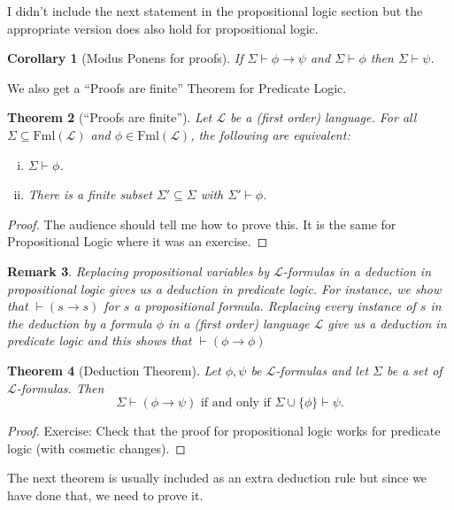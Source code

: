 \documentclass[11pt]{article}
\newcommand{\proves}{\vdash}
\newcommand{\Fml}{\textrm{Fml}}
\newtheorem{theorem}{Theorem}[section]
\newtheorem{remark}[theorem]{Remark}
\newtheorem{cor}[theorem]{Corollary}
\newcommand{\mcal}[1]{\mathcal{#1}}
\begin{document}
I didn't include the next statement in the propositional logic section but the appropriate version does also hold for propositional logic.

\begin{cor}[Modus Ponens for proofs]
If $\Sigma\proves \phi\rightarrow \psi$ and $\Sigma\proves \phi$ then $\Sigma\proves \psi$.
\end{cor}


We also get a ``Proofs are finite'' Theorem for Predicate Logic.

\begin{theorem}[``Proofs are finite'']
Let $\mcal{L}$ be a (first order) language. For all $\Sigma\subseteq \Fml(\mcal{L})$ and $\phi\in \Fml(\mcal{L})$, the following are equivalent:
\begin{enumerate}[(i)]
\item $\Sigma\proves \phi$.
\item There is a finite subset $\Sigma'\subseteq \Sigma$ with $\Sigma'\proves \phi$.
\end{enumerate}
\end{theorem}
\begin{proof}
The audience should tell me how to prove this. It is the same for Propositional Logic where it was an exercise.
\end{proof}

\begin{remark}
Replacing propositional variables by $\mcal{L}$-formulas in a deduction in propositional logic gives us a deduction in predicate logic. For instance, we show that $\vdash (s\rightarrow s)$ for $s$ a propositional formula. Replacing every instance of $s$ in the deduction by a formula $\phi$ in a (first order) language $\mcal{L}$ give us a deduction in predicate logic and this shows that $\vdash (\phi\rightarrow \phi)$
\end{remark}

\begin{theorem}[Deduction Theorem]
Let $\phi,\psi$ be $\mcal{L}$-formulas and let $\Sigma$ be a set of $\mcal{L}$-formulas. Then
\[\Sigma\proves (\phi\rightarrow \psi) \text{ if and only if }\Sigma\cup\{\phi\}\proves \psi.\]
\end{theorem}
\begin{proof}
Exercise: Check that the proof for propositional logic works for predicate logic (with cosmetic changes).
\end{proof}

The next theorem is usually included as an extra deduction rule but since we have done that, we need to prove it.
\end{document}
